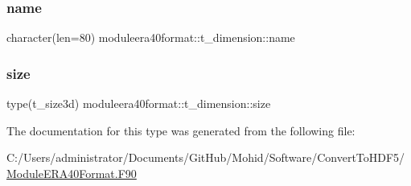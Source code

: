 \subsubsection{\texorpdfstring{name}{name}}
{\footnotesize\ttfamily character(len=80) moduleera40format\+::t\+\_\+dimension\+::name\hspace{0.3cm}{\ttfamily [private]}}

\mbox{\label{structmoduleera40format_1_1t__dimension_a7cfb2eb021976afd0369c48b1d273da8}} 
\subsubsection{\texorpdfstring{size}{size}}
{\footnotesize\ttfamily type(t\+\_\+size3d) moduleera40format\+::t\+\_\+dimension\+::size\hspace{0.3cm}{\ttfamily [private]}}



The documentation for this type was generated from the following file\+:\begin{DoxyCompactItemize}
\item 
C\+:/\+Users/administrator/\+Documents/\+Git\+Hub/\+Mohid/\+Software/\+Convert\+To\+H\+D\+F5/\mbox{\hyperlink{_module_e_r_a40_format_8_f90}{Module\+E\+R\+A40\+Format.\+F90}}\end{DoxyCompactItemize}

